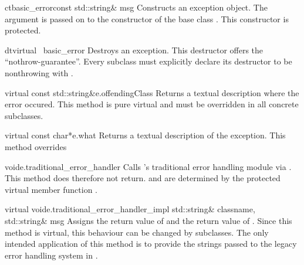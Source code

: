 
\CONS

\begin{fcode}{ct}{basic_error}{const std::string& msg}
  Constructs an exception object. The argument is passed on to the constructor
  of the base class . This constructor is protected.
\end{fcode}

\begin{fcode}{dt}{virtual ~basic_error}{}
  Destroys an exception. This destructor offers the
  ``nothrow-guarantee''. Every subclass must explicitly declare its destructor
  to be nonthrowing with .
\end{fcode}


\ACCS

\begin{cfcode}{virtual const std::string&}{e.offendingClass}{}
  Returns a textual description where the error occured. This method is pure
  virtual and must be overridden in all concrete subclasses.
\end{cfcode}

\begin{cfcode}{virtual const char*}{e.what}{}
  Returns a textual description of the exception. This
  method overrides 
\end{cfcode}


\HIGH

\begin{cfcode}{void}{e.traditional_error_handler}{}
  Calls \LiDIA's traditional error handling module via
  . This method does therefore not
  return.  and  are determined by the protected
  virtual member function 
  .
\end{cfcode}

\begin{Tcfcode}{virtual void}{e.traditional_error_handler_impl}{%
    std::string& classname, std::string& msg}
  Assigns  the return value of  and
   the return value of . Since this method is virtual,
  this behaviour can be changed by subclasses. The only intended application
  of this method is to provide the strings passed to the legacy error handling
  system in .
\end{Tcfcode}


